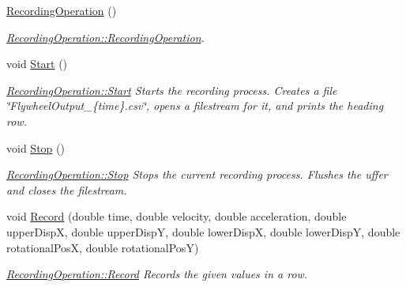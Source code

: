 \begin{DoxyCompactItemize}
\item 
\hypertarget{class_recording_operation_a6335d0740c99799eb6cb094501019b07}{}\label{class_recording_operation_a6335d0740c99799eb6cb094501019b07} 
\hyperlink{class_recording_operation_a6335d0740c99799eb6cb094501019b07}{Recording\+Operation} ()
\begin{DoxyCompactList}\small\item\em \hyperlink{class_recording_operation_a6335d0740c99799eb6cb094501019b07}{Recording\+Operation\+::\+Recording\+Operation}. \end{DoxyCompactList}\item 
\hypertarget{class_recording_operation_a9de73122788d5da0a2d747ae73df9bdf}{}\label{class_recording_operation_a9de73122788d5da0a2d747ae73df9bdf} 
void \hyperlink{class_recording_operation_a9de73122788d5da0a2d747ae73df9bdf}{Start} ()
\begin{DoxyCompactList}\small\item\em \hyperlink{class_recording_operation_a9de73122788d5da0a2d747ae73df9bdf}{Recording\+Operation\+::\+Start} Starts the recording process. Creates a file \char`\"{}\+Flywheel\+Output\+\_\+\{time\}.\+csv\char`\"{}, opens a filestream for it, and prints the heading row. \end{DoxyCompactList}\item 
\hypertarget{class_recording_operation_afa9953a7cdce60344d090eb95a4d0d13}{}\label{class_recording_operation_afa9953a7cdce60344d090eb95a4d0d13} 
void \hyperlink{class_recording_operation_afa9953a7cdce60344d090eb95a4d0d13}{Stop} ()
\begin{DoxyCompactList}\small\item\em \hyperlink{class_recording_operation_afa9953a7cdce60344d090eb95a4d0d13}{Recording\+Operation\+::\+Stop} Stops the current recording process. Flushes the uffer and closes the filestream. \end{DoxyCompactList}\item 
void \hyperlink{class_recording_operation_a1a341c41178b05e95bc434510dfeedca}{Record} (double time, double velocity, double acceleration, double upper\+DispX, double upper\+DispY, double lower\+DispX, double lower\+DispY, double rotational\+PosX, double rotational\+PosY)
\begin{DoxyCompactList}\small\item\em \hyperlink{class_recording_operation_a1a341c41178b05e95bc434510dfeedca}{Recording\+Operation\+::\+Record} Records the given values in a row. \end{DoxyCompactList}\end{DoxyCompactItemize}


